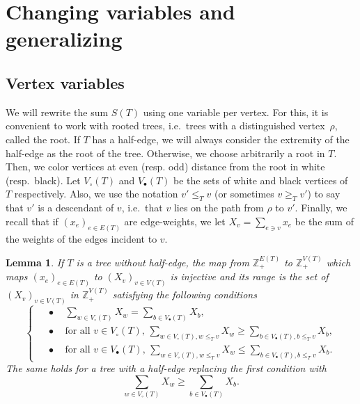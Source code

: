 \documentclass[12pt]{amsart}
\theoremstyle{plain}
\newtheorem{lemma}{Lemma}
\theoremstyle{remark}
\begin{document}
\section{Changing variables and generalizing}
\label{sec:change_variables}
\subsection{Vertex variables}
We will rewrite the sum $S(T)$ using one variable per vertex.
For this, it is convenient to work with rooted trees, i.e.~trees with a distinguished vertex~$\rho$,
called the root.
If $T$ has a half-edge, we will always consider the extremity of the half-edge as the root
of the tree.
Otherwise, we choose arbitrarily a root in $T$.
Then, we color vertices at even (resp. odd) distance from the root
in white (resp.~black). Let $V_{\circ}(T)$ and $V_{\bullet}(T)$ be the sets
of white and black vertices of $T$ respectively.
Also, we use the notation $v' \le_T v$ (or sometimes $v \geq_T v'$) to say that $v'$ is a descendant of $v$, 
i.e.~that $v$ lies on the path from $\rho$ to $v'$. 
Finally, we recall that if $(x_e)_{e \in E(T)}$ are edge-weights,
we let $X_v=\sum_{e \ni v} x_e$ be the sum of the weights of the edges incident to $v$.
\begin{lemma}\label{lem:changing_variables}
If $T$ is a tree without half-edge,
the map from $\mathbb Z_+^{E(T)}$ to $\mathbb Z_+^{V(T)}$
which maps $(x_e)_{e \in E(T)}$ to $(X_v)_{v \in V(T)}$ is injective and its range
is the set of $(X_v)_{v \in V(T)}$ in $\mathbb Z_+^{V(T)}$ satisfying the following conditions
\begin{equation}
\label{eq:changeofvariable}
 \begin{cases}
\quad\bullet\quad \sum_{w  \in V_{\circ}(T)} X_w = \sum_{b \in V_{\bullet}(T)} X_b, \\
\quad \bullet\quad \text{for all $v \in V_{\circ}(T)$, }  \sum_{w  \in V_{\circ}(T), w \le_T v} X_{w} \ge 
\sum_{b \in V_{\bullet}(T), b \le_T v} X_b, \\
\quad \bullet\quad \text{for all $v \in V_{\bullet}(T)$, } 
\sum_{w \in V_{\circ}(T), w \le_T v} X_w \le 
\sum_{b \in V_{\bullet}(T),  b \le_T v} X_{b}.
\end{cases}
\end{equation}
The same holds for a tree with a half-edge replacing the first condition 
with $$\textstyle \sum_{w  \in V_{\circ}(T)} X_w  \ge \sum_{b \in V_{\bullet}(T)} X_b.$$ 
\end{lemma}
\end{document}
